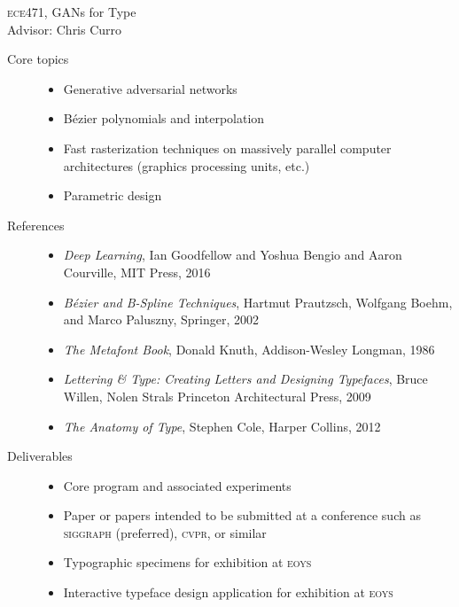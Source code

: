 \documentclass{article}
\begin{document}
{
  \fontsize{12pt}{18pt}\selectfont
  {\scshape ece}471, GANs for Type\\
  Advisor: Chris Curro
}
\raggedright
\raggedbottom
\fontsize{12pt}{16pt}\selectfont 
{}

\begin{description}

\item[Core topics] \hfill
  
  \begin{itemize}[leftmargin=-0.25cm]
  \item Generative adversarial networks
  \item Bézier polynomials and interpolation
  \item Fast rasterization techniques on massively parallel computer
    architectures (graphics processing units, etc.)
  \item Parametric design
  \end{itemize}

\item[References] \hfill
  
  \begin{itemize}[leftmargin=-0.25cm]
  \item {\itshape Deep Learning}, Ian Goodfellow and Yoshua Bengio and
    Aaron Courville, MIT Press, 2016
  \item {\itshape Bézier and B-Spline Techniques}, Hartmut Prautzsch,
    Wolfgang Boehm, and Marco Paluszny, Springer, 2002
  \item {\itshape The Metafont Book}, Donald Knuth, Addison-Wesley
    Longman, 1986
  \item {\itshape Lettering \& Type: Creating Letters and Designing
    Typefaces}, Bruce Willen, Nolen Strals Princeton Architectural
    Press, 2009
  \item {\itshape The Anatomy of Type}, Stephen Cole, Harper Collins,
    2012
  \end{itemize}

\item[Deliverables] \hfill
  
  \begin{itemize}[leftmargin=-0.25cm]
  \item Core program and associated experiments
  \item Paper or papers intended to be submitted at a conference such
    as {\scshape siggraph} (preferred), {\scshape cvpr}, or similar
  \item Typographic specimens for exhibition at {\scshape eoys}
  \item Interactive typeface design application for exhibition at
    {\scshape eoys}
  \end{itemize}
    

\end{description}
\end{document}
